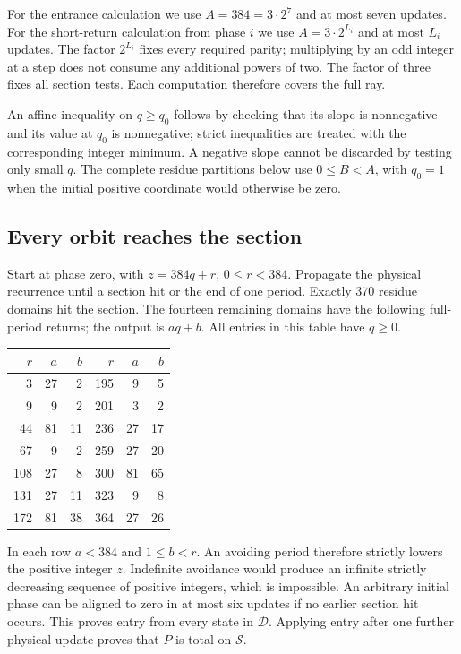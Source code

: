 For the entrance calculation we use $A=384=3\cdot2^7$ and at most
seven updates.  For the short-return calculation from phase $i$ we use
$A=3\cdot2^{L_i}$ and at most $L_i$ updates.  The factor $2^{L_i}$
fixes every required parity; multiplying by an odd integer at a step
does not consume any additional powers of two.  The factor of three
fixes all section tests.  Each computation therefore covers the full ray.

An affine inequality on $q\ge q_0$ follows by checking that its slope
is nonnegative and its value at $q_0$ is nonnegative; strict inequalities
are treated with the corresponding integer minimum.  A negative slope
cannot be discarded by testing only small $q$.  The complete residue
partitions below use $0\le B<A$, with $q_0=1$ when the initial positive
coordinate would otherwise be zero.

\subsection{Every orbit reaches the section}

Start at phase zero, with $z=384q+r$, $0\le r<384$.  Propagate the
physical recurrence until a section hit or the end of one period.
Exactly 370 residue domains hit the section.  The fourteen remaining
domains have the following full-period returns; the output is $aq+b$.
All entries in this table have $q\ge0$.
\begin{center}
\begin{tabular}{rrr|rrr}
\hline
$r$&$a$&$b$&$r$&$a$&$b$\\ \hline
3&27&2&195&9&5\\
9&9&2&201&3&2\\
44&81&11&236&27&17\\
67&9&2&259&27&20\\
108&27&8&300&81&65\\
131&27&11&323&9&8\\
172&81&38&364&27&26\\ \hline
\end{tabular}
\end{center}
In each row $a<384$ and $1\le b<r$.  An avoiding period therefore
strictly lowers the positive integer $z$.  Indefinite avoidance would
produce an infinite strictly decreasing sequence of positive integers,
which is impossible.  An arbitrary initial phase can be aligned to zero
in at most six updates if no earlier section hit occurs.  This proves
entry from every state in $\mathcal D$.  Applying entry after one
further physical update proves that $P$ is total on $\mathcal S$.

